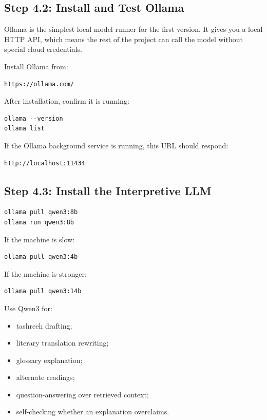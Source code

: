\documentclass[11pt]{article}
\begin{document}
\subsection{Step 4.2: Install and Test Ollama}

Ollama is the simplest local model runner for the first version. It gives you a
local HTTP API, which means the rest of the project can call the model without
special cloud credentials.

Install Ollama from:

\begin{verbatim}
https://ollama.com/
\end{verbatim}

After installation, confirm it is running:

\begin{verbatim}
ollama --version
ollama list
\end{verbatim}

If the Ollama background service is running, this URL should respond:

\begin{verbatim}
http://localhost:11434
\end{verbatim}

\subsection{Step 4.3: Install the Interpretive LLM}

\begin{verbatim}
ollama pull qwen3:8b
ollama run qwen3:8b
\end{verbatim}

If the machine is slow:

\begin{verbatim}
ollama pull qwen3:4b
\end{verbatim}

If the machine is stronger:

\begin{verbatim}
ollama pull qwen3:14b
\end{verbatim}

Use Qwen3 for:

\begin{itemize}
  \item tashreeh drafting;
  \item literary translation rewriting;
  \item glossary explanation;
  \item alternate readings;
  \item question-answering over retrieved context;
  \item self-checking whether an explanation overclaims.
\end{itemize}
\end{document}
